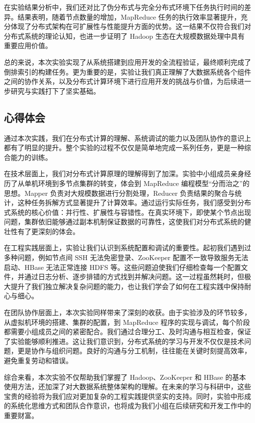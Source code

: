 \documentclass[]{bitreport}
\begin{document}
在实验结果分析中，我们还对比了伪分布式与完全分布式环境下任务执行时间的差异。结果表明，随着节点数量的增加，MapReduce 任务的执行效率显著提升，充分体现了分布式架构在可扩展性与性能提升方面的优势。这一结果不仅符合我们对分布式系统的理论认知，也进一步证明了 Hadoop 生态在大规模数据处理中具有重要应用价值。

总的来说，本次实验实现了从系统搭建到应用开发的全流程验证，最终顺利完成了倒排索引的构建任务。更为重要的是，实验让我们真正理解了大数据系统各个组件之间的协作关系，以及分布式计算环境下进行应用开发的挑战与价值，为后续进一步研究与实践打下了坚实基础。


\subsection{心得体会}

通过本次实践，我们在分布式计算的理解、系统调试的能力以及团队协作的意识上都有了明显的提升。整个实验的过程不仅仅是简单地完成一系列任务，更是一种综合能力的训练。

在技术层面上，我们对分布式计算原理的理解得到了加深。实验中小组成员亲身经历了从单机环境到多节点集群的转变，体会到 MapReduce 编程模型“分而治之”的思想。Mapper 负责对大规模数据进行分割处理，Reducer 负责结果的聚合与统计，这种任务拆解方式显著提升了计算效率。通过运行实际任务，我们感受到分布式系统的核心价值：并行性、扩展性与容错性。在真实环境下，即使某个节点出现问题，集群依旧能够通过副本机制保证数据的可靠性，这使我们对分布式系统的健壮性有了更深刻的体会。

在工程实践层面上，实验让我们认识到系统配置和调试的重要性。起初我们遇到过多种问题，例如节点间 SSH 无法免密登录、ZooKeeper 配置不一致导致服务无法启动、HBase 无法正常连接 HDFS 等。这些问题迫使我们仔细检查每一个配置文件，并通过日志分析、逐步排错的方式找到并解决问题。这一过程虽然耗时，但极大提升了我们独立解决复杂问题的能力，也让我们学会了如何在工程实践中保持耐心与细心。

在团队协作层面上，本次实验同样带来了深刻的收获。由于实验涉及的环节较多，从虚拟机环境的搭建、集群的配置，到 MapReduce 程序的实现与调试，每个阶段都需要小组成员之间的紧密配合。我们通过合理分工、及时沟通与相互检查，保证了实验能够顺利推进。这让我们意识到，分布式系统的学习与开发不仅仅是技术问题，更是协作与组织问题。良好的沟通与分工机制，往往能在关键时刻提高效率，避免重复劳动和错误。

综合来看，本次实验不仅帮助我们掌握了 Hadoop、ZooKeeper 和 HBase 的基本使用方法，还加深了对大数据系统整体架构的理解。在未来的学习与科研中，这些宝贵的经验将为我们应对更加复杂的工程实践提供坚实的支持。同时，实验中形成的系统化思维方式和团队合作意识，也将成为我们小组在后续研究和开发工作中的重要财富。


\printbibliography[heading=bibliography,title=参考文献]
\end{document}
